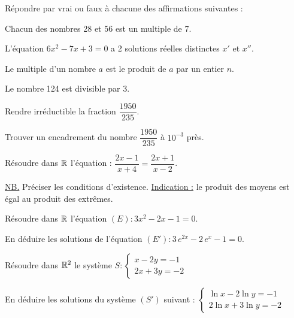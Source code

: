 \documentclass[11pt]{article}
\begin{document}

\begin{questions}
  \item Répondre par vrai ou faux à chacune des affirmations suivantes :
  \begin{sousq}
    \item Chacun des nombres 28 et 56 est un multiple de 7.
    \item L'équation $6x^2 - 7x + 3 = 0$ a 2 solutions réelles distinctes $x'$ et $x''$.
    \item Le multiple d'un nombre $a$ est le produit de $a$ par un entier $n$.
    \item Le nombre 124 est divisible par 3.
  \end{sousq}
  \item \begin{sousq}
    \item Rendre irréductible la fraction $\dfrac{1950}{235}$.
    \item Trouver un encadrement du nombre $\dfrac{1950}{235}$ à $10^{-3}$ près.
  \end{sousq}
\end{questions}

\begin{questions}
  \item Résoudre dans $\mathbb{R}$ l'équation : $\dfrac{2x - 1}{x + 4} = \dfrac{2x + 1}{x - 2}$.

  \underline{NB.} Préciser les conditions d'existence. \underline{Indication :} le produit des moyens est égal au produit des extrêmes.
  \item \begin{sousq}
    \item Résoudre dans $\mathbb{R}$ l'équation $(E) : 3x^2 - 2x - 1 = 0$.
    \item En déduire les solutions de l'équation $(E') : 3\,e^{2x} - 2\,e^{x} - 1 = 0$.
  \end{sousq}
  \item \begin{sousq}
    \item Résoudre dans $\mathbb{R}^2$ le système $S : \begin{cases} x - 2y = -1 \\ 2x + 3y = -2 \end{cases}$
    \item En déduire les solutions du système $(S')$ suivant : $\begin{cases} \ln x - 2\ln y = -1 \\ 2\ln x + 3\ln y = -2 \end{cases}$
  \end{sousq}
\end{questions}
\end{document}

